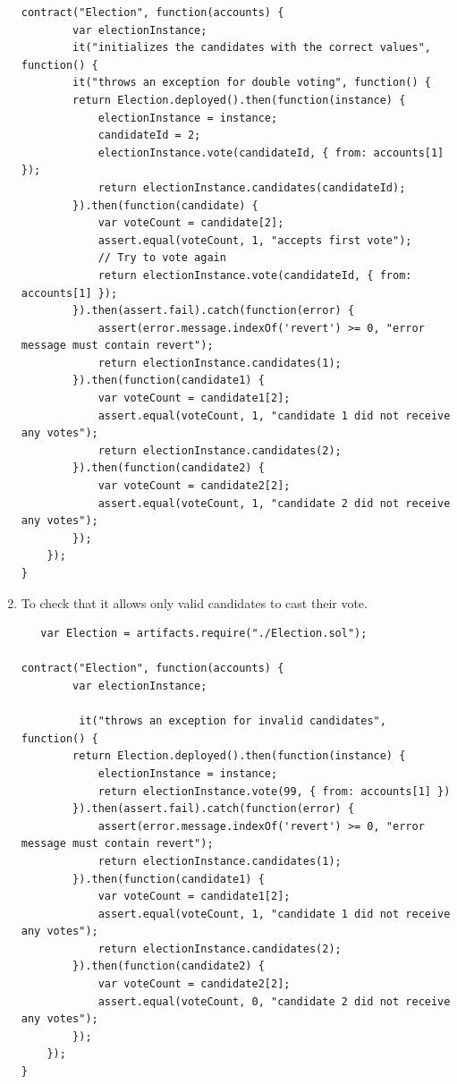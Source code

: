 \documentclass{report}
\begin{document}
\begin{enumerate}
\begin{verbatim}
contract("Election", function(accounts) {
        var electionInstance;
        it("initializes the candidates with the correct values", function() {
        it("throws an exception for double voting", function() {
        return Election.deployed().then(function(instance) {
            electionInstance = instance;
            candidateId = 2;
            electionInstance.vote(candidateId, { from: accounts[1] });
            return electionInstance.candidates(candidateId);
        }).then(function(candidate) {
            var voteCount = candidate[2];
            assert.equal(voteCount, 1, "accepts first vote");
            // Try to vote again
            return electionInstance.vote(candidateId, { from: accounts[1] });
        }).then(assert.fail).catch(function(error) {
            assert(error.message.indexOf('revert') >= 0, "error message must contain revert");
            return electionInstance.candidates(1);
        }).then(function(candidate1) {
            var voteCount = candidate1[2];
            assert.equal(voteCount, 1, "candidate 1 did not receive any votes");
            return electionInstance.candidates(2);
        }).then(function(candidate2) {
            var voteCount = candidate2[2];
            assert.equal(voteCount, 1, "candidate 2 did not receive any votes");
        });
    });
}

   \end{verbatim}
   
   \item To check that it allows only valid candidates to cast their vote.
   \begin{verbatim}
   var Election = artifacts.require("./Election.sol");

contract("Election", function(accounts) {
        var electionInstance;
   
         it("throws an exception for invalid candidates", function() {
        return Election.deployed().then(function(instance) {
            electionInstance = instance;
            return electionInstance.vote(99, { from: accounts[1] })
        }).then(assert.fail).catch(function(error) {
            assert(error.message.indexOf('revert') >= 0, "error message must contain revert");
            return electionInstance.candidates(1);
        }).then(function(candidate1) {
            var voteCount = candidate1[2];
            assert.equal(voteCount, 1, "candidate 1 did not receive any votes");
            return electionInstance.candidates(2);
        }).then(function(candidate2) {
            var voteCount = candidate2[2];
            assert.equal(voteCount, 0, "candidate 2 did not receive any votes");
        });
    });
} 
 \end{verbatim}

\end{enumerate}
\end{document}
